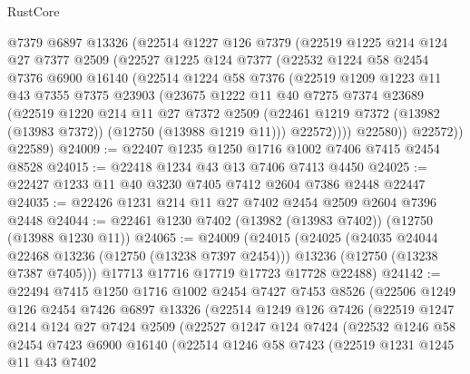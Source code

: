 \begin{lexlean}{RustCore}
\begin{coremodule}
      @7379
      @6897
      @13326
      (@22514
        @1227
        @126
        @7379
        (@22519
          @1225
          @214
          @124
          @27
          @7377
          @2509
          (@22527
            @1225
            @124
            @7377
            (@22532
              @1224
              @58
              @2454
              @7376
              @6900
              @16140
              (@22514
                @1224
                @58
                @7376
                (@22519
                  @1209
                  @1223
                  @11
                  @43
                  @7355
                  @7375
                  @23903
                  (@23675
                    @1222
                    @11
                    @40
                    @7275
                    @7374
                    @23689
                    (@22519
                      @1220
                      @214
                      @11
                      @27
                      @7372
                      @2509
                      (@22461 @1219 @7372 (@13982 (@13983 @7372)) (@12750 (@13988 @1219 @11)))
                      @22572))))
              @22580))
          @22572))
      @22589)
@24009 := @22407 @1235 @1250 @1716 @1002 @7406 @7415 @2454 @8528
@24015 := @22418 @1234 @43 @13 @7406 @7413 @4450
@24025 := @22427 @1233 @11 @40 @3230 @7405 @7412 @2604 @7386 @2448 @22447
@24035 := @22426 @1231 @214 @11 @27 @7402 @2454 @2509 @2604 @7396 @2448
@24044 := @22461 @1230 @7402 (@13982 (@13983 @7402)) (@12750 (@13988 @1230 @11))
@24065 := @24009
    (@24015
      (@24025
        (@24035 @24044 @22468 @13236 (@12750 (@13238 @7397 @2454)))
        @13236
        (@12750 (@13238 @7387 @7405)))
      @17713
      @17716
      @17719
      @17723
      @17728
      @22488)
@24142 := @22494
    @7415
    @1250
    @1716
    @1002
    @2454
    @7427
    @7453
    @8526
    (@22506
      @1249
      @126
      @2454
      @7426
      @6897
      @13326
      (@22514
        @1249
        @126
        @7426
        (@22519
          @1247
          @214
          @124
          @27
          @7424
          @2509
          (@22527
            @1247
            @124
            @7424
            (@22532
              @1246
              @58
              @2454
              @7423
              @6900
              @16140
              (@22514
                @1246
                @58
                @7423
                (@22519
                  @1231
                  @1245
                  @11
                  @43
                  @7402

\end{coremodule}
\end{lexlean}
